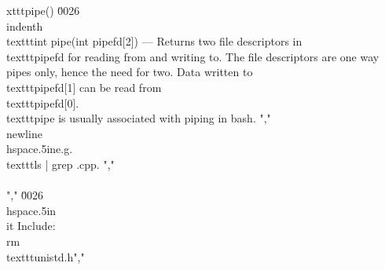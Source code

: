 xttt{pipe()} \u0026 \\indenth\\texttt{int pipe(int pipefd[2])} --- Returns two file descriptors in \\texttt{pipefd} for reading from and writing to. The file descriptors are one way pipes only, hence the need for two. Data written to \\texttt{pipefd[1]} can be read from \\texttt{pipefd[0]}. \\texttt{pipe} is usually associated with piping in bash. ","    \\newline\\hspace{.5in}e.g. \\texttt{ls | grep .cpp}. ","        \\\\","    \u0026 \\hspace{.5in}\\it Include: \\rm\\texttt{unistd.h}","        %